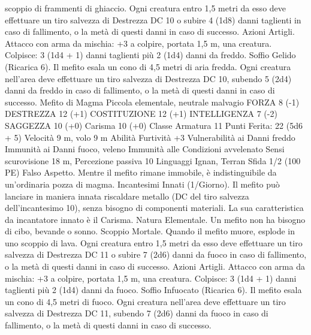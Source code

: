 \begin{multicols}{2}
scoppio di frammenti di ghiaccio. Ogni creatura entro 1,5 metri
da esso deve effettuare un tiro salvezza di Destrezza DC 10 o
subire 4 (1d8) danni taglienti in caso di fallimento, o la metà di
questi danni in caso di successo.
Azioni
Artigli. Attacco con arma da mischia: +3 a colpire, portata 1,5
m, una creatura.
Colpisce: 3 (1d4 + 1) danni taglienti più 2 (1d4) danni da freddo.
Soffio Gelido (Ricarica 6). Il mefito esala un cono di 4,5 metri di
aria fredda. Ogni creatura nell’area deve effettuare un tiro
salvezza di Destrezza DC 10, subendo 5 (2d4) danni da freddo in
caso di fallimento, o la metà di questi danni in caso di successo.
Mefito di Magma
Piccola elementale, neutrale malvagio
FORZA 8 (-1)
DESTREZZA 12 (+1)
COSTITUZIONE 12 (+1)
INTELLIGENZA 7 (-2)
SAGGEZZA 10 (+0)
Carisma 10 (+0)
Classe Armatura 11
\hspace*{0pt}\hfill{Punti Ferita}: 22 (5d6 + 5)
Velocità 9 m, volo 9 m
Abilità Furtività +3
Vulnerabilità ai Danni freddo
Immunità ai Danni fuoco, veleno
Immunità alle Condizioni avvelenato
Sensi scurovisione 18 m, Percezione passiva 10
Linguaggi Ignan, Terran
Sfida 1/2 (100 PE)
Falso Aspetto. Mentre il mefito rimane immobile, è
indistinguibile da un’ordinaria pozza di magma.
Incantesimi Innati (1/Giorno). Il mefito può lanciare in maniera
innata riscaldare metallo (DC del tiro salvezza dell’incantesimo
10), senza bisogno di componenti materiali. La sua caratteristica
da incantatore innato è il Carisma.
Natura Elementale. Un mefito non ha bisogno di cibo, bevande
o sonno.
Scoppio Mortale. Quando il mefito muore, esplode in uno
scoppio di lava. Ogni creatura entro 1,5 metri da esso deve
effettuare un tiro salvezza di Destrezza DC 11 o subire 7 (2d6)
danni da fuoco in caso di fallimento, o la metà di questi danni in
caso di successo.
Azioni
Artigli. Attacco con arma da mischia: +3 a colpire, portata 1,5
m, una creatura.
Colpisce: 3 (1d4 + 1) danni taglienti più 2 (1d4) danni da fuoco.
Soffio Infuocato (Ricarica 6). Il mefito esala un cono di 4,5
metri di fuoco. Ogni creatura nell’area deve effettuare un tiro
salvezza di Destrezza DC 11, subendo 7 (2d6) danni da fuoco in
caso di fallimento, o la metà di questi danni in caso di successo.
 

\end{multicols}
